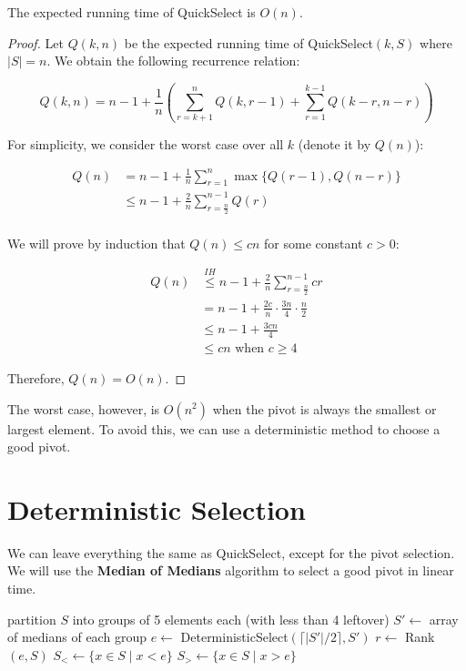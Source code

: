 \begin{theorem}
	The expected running time of QuickSelect is $O(n)$.
\end{theorem}
\begin{proof}
	Let $Q(k,n)$ be the expected running time of QuickSelect$(k,S)$ where $|S|=n$. We obtain the following recurrence relation:

	\[
		Q(k,n) = n-1 + \frac{1}{n} \left( \sum_{r = k+1}^{n}Q(k,r-1) + \sum_{r=1}^{k-1} Q(k-r,n-r) \right)
	\]

	For simplicity, we consider the worst case over all $k$ (denote it by $Q(n)$):

	\begin{align*}
		Q(n) & = n-1 + \frac{1}{n} \sum_{r=1}^{n} \max\{Q(r-1), Q(n-r)\} \\
		     & \leq n-1 + \frac{2}{n} \sum_{r = \frac{n}{2}}^{n-1} Q(r)  \\
	\end{align*}

	We will prove by induction that $Q(n) \leq c n$ for some constant $c > 0$:

	\begin{align*}
		Q(n) & \overset{IH}{\leq} n-1 + \frac{2}{n} \sum_{r = \frac{n}{2}}^{n-1} c r \\
		     & = n-1 + \frac{2c}{n}\cdot\frac{3n}{4}\cdot \frac{n}{2}                \\
		     & \leq n-1 + \frac{3cn}{4}                                              \\
		     & \leq cn \text{ when } c \geq 4
	\end{align*}

	Therefore, $Q(n) = O(n)$.
\end{proof}

The worst case, however, is $O(n^2)$ when the pivot is always the smallest or largest element. To avoid this, we can use a deterministic method to choose a good pivot.

\section{Deterministic Selection}

We can leave everything the same as QuickSelect, except for the pivot selection. We will use the \textbf{Median of Medians} algorithm to select a good pivot in linear time.

\begin{algorithm}[H]
	\caption{DeterministicSelect$(k,S)$}
	partition $S$ into groups of 5 elements each (with less than 4 leftover)\;
	$S'\gets$ array of medians of each group\;
	$e \gets$ DeterministicSelect$(\lceil |S'|/2 \rceil, S')$\;
	$r \gets$ Rank$(e,S)$\;
	$S_<\gets \{x \in S \mid x < e\}$\;
	$S_>\gets \{x \in S \mid x > e\}$\;
\end{algorithm}

